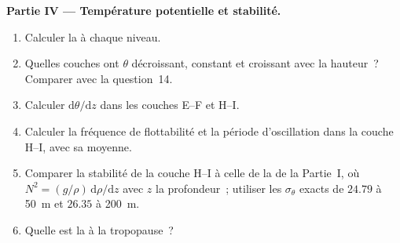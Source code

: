 \begin{problem}
\medskip
\noindent\textbf{Partie IV --- Température potentielle et stabilité.}
\begin{enumerate}[resume]
  \item Calculer la  à chaque niveau.
  \item Quelles couches ont $\theta$ décroissant, constant et croissant avec la
        hauteur~? Comparer avec la question~14.
  \item Calculer $\mathrm d\theta/\mathrm dz$ dans les couches E--F et H--I.
  \item Calculer la fréquence de flottabilité et la période d'oscillation dans la couche
        H--I, avec sa  moyenne.
  \item Comparer la stabilité de la couche H--I à celle de la 
        de la Partie~I, où $N^2 = (g/\rho)\,\mathrm d\rho/\mathrm dz$ avec $z$ la profondeur~; utiliser les
        $\sigma_\theta$ exacts de $24.79$ à \qty{50}{m} et $26.35$ à
        \qty{200}{m}.
  \item Quelle est la  à la tropopause~?
\end{enumerate}
\end{problem}

